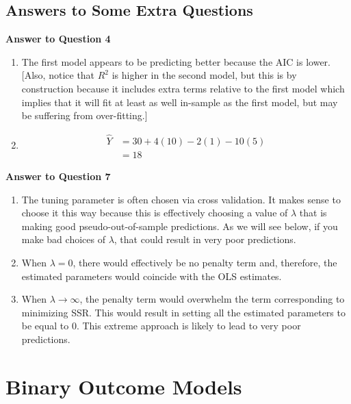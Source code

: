 \documentclass[
  letterpaper,
  DIV=11,
  numbers=noendperiod]{scrreprt}
\begin{document}
\section{Answers to Some Extra
Questions}\label{answers-to-some-extra-questions-1}

\textbf{Answer to Question 4}

\begin{enumerate}
\def\labelenumi{\alph{enumi})}
\item
  The first model appears to be predicting better because the AIC is
  lower. {[}Also, notice that \(R^2\) is higher in the second model, but
  this is by construction because it includes extra terms relative to
  the first model which implies that it will fit at least as well
  in-sample as the first model, but may be suffering from
  over-fitting.{]}
\item
  \begin{align*}
     \hat{Y} &= 30 + 4 (10) - 2 (1) - 10 (5) \\
     &= 18
   \end{align*}
\end{enumerate}

\textbf{Answer to Question 7}

\begin{enumerate}
\def\labelenumi{\alph{enumi})}
\item
  The tuning parameter is often chosen via cross validation. It makes
  sense to choose it this way because this is effectively choosing a
  value of \(\lambda\) that is making good pseudo-out-of-sample
  predictions. As we will see below, if you make bad choices of
  \(\lambda\), that could result in very poor predictions.
\item
  When \(\lambda=0\), there would effectively be no penalty term and,
  therefore, the estimated parameters would coincide with the OLS
  estimates.
\item
  When \(\lambda \rightarrow \infty\), the penalty term would overwhelm
  the term corresponding to minimizing SSR. This would result in setting
  all the estimated parameters to be equal to 0. This extreme approach
  is likely to lead to very poor predictions.
\end{enumerate}


\chapter{Binary Outcome Models}\label{binary-outcome-models}
\end{document}
